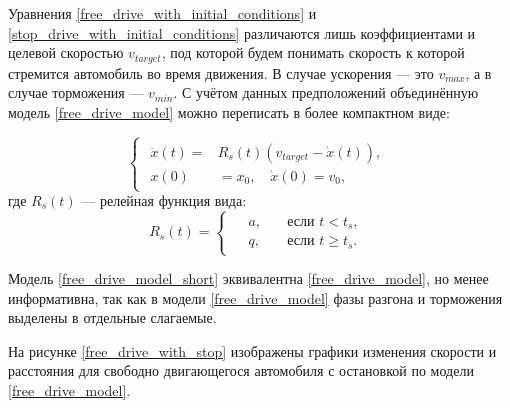 \documentclass[12pt, a4paper]{extarticle}
\numberwithin{equation}{section}
\numberwithin{figure}{section}
\begin{document}
Уравнения \eqref{free_drive_with_initial_conditions} и  \eqref{stop_drive_with_initial_conditions} различаются лишь коэффициентами и целевой скоростью $v_{target}$, под которой будем понимать скорость к которой стремится автомобиль во время движения. В случае ускорения --- это $v_{max}$, а в случае торможения --- $v_{min}$. С учётом данных предположений объединённую модель \eqref{free_drive_model} можно переписать в более компактном виде:

\begin{equation} \label{free_drive_model_short}
\begin{cases}
\begin{split}
\ddot{x}(t) = &R_s(t) \left(v_{target}-\dot{x}(t) \right), \\
x(0)&=x_0, \quad \dot{x}(0)=v_{0},
\end{split}
\end{cases}
\end{equation}
где $R_s(t)$ --- релейная функция вида:
\begin{equation*}
R_s(t)=
\begin{cases}
\begin{split}
&a, \quad&\text{если } t<t_{s}, \\
&q, \quad&\text{если } t\geq t_{s}.
\end{split}
\end{cases}
\end{equation*}

Модель \eqref{free_drive_model_short} эквивалентна \eqref{free_drive_model}, но менее информативна, так как в модели \eqref{free_drive_model} фазы разгона и торможения выделены в отдельные слагаемые.

На рисунке \ref{free_drive_with_stop} изображены графики изменения скорости и расстояния для свободно двигающегося автомобиля с остановкой по модели \eqref{free_drive_model}.
\end{document}
